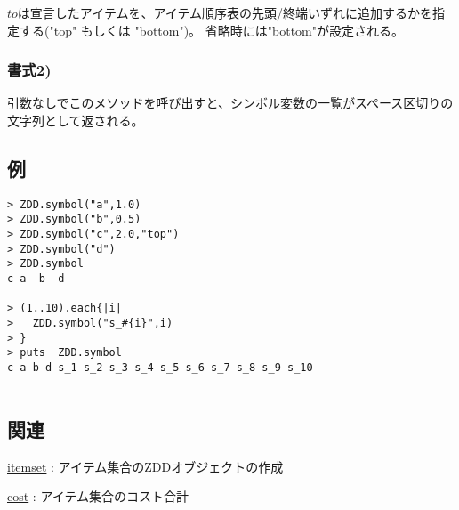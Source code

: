 $to$は宣言したアイテムを、アイテム順序表の先頭/終端いずれに追加するかを指定する("top" もしくは "bottom")。
省略時には"bottom"が設定される。

\subsubsection{書式2)}

引数なしでこのメソッドを呼び出すと、シンボル変数の一覧がスペース区切りの文字列として返される。

\subsection*{例}
\begin{Verbatim}[baselinestretch=0.7,frame=single]
> ZDD.symbol("a",1.0)
> ZDD.symbol("b",0.5)
> ZDD.symbol("c",2.0,"top")
> ZDD.symbol("d")
> ZDD.symbol
c a  b  d

> (1..10).each{|i|
>   ZDD.symbol("s_#{i}",i)
> }
> puts  ZDD.symbol
c a b d s_1 s_2 s_3 s_4 s_5 s_6 s_7 s_8 s_9 s_10


\end{Verbatim}

\subsection*{関連}
\hyperref[sect:itemset]{itemset} : アイテム集合のZDDオブジェクトの作成

\hyperref[sect:cost]{cost} : アイテム集合のコスト合計

